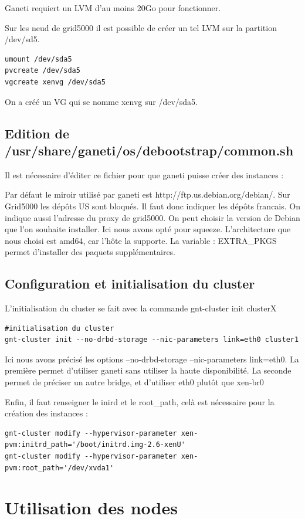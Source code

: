 Ganeti requiert un LVM d'au moins 20Go pour fonctionner.

Sur les neud de grid5000 il est possible de créer un tel LVM sur la partition /dev/sd5.
\begin{lstlisting}
umount /dev/sda5
pvcreate /dev/sda5
vgcreate xenvg /dev/sda5
\end{lstlisting}
On a créé un VG qui se nomme xenvg sur /dev/sda5.

\subsection {Edition de /usr/share/ganeti/os/debootstrap/common.sh}

Il est nécessaire d'éditer ce fichier pour que ganeti puisse créer des instances :

Par défaut le miroir utilisé par ganeti est http://ftp.us.debian.org/debian/. Sur Grid5000 les dépôts US sont bloqués. Il faut donc indiquer les dépôts francais.
On indique aussi l'adresse du proxy de grid5000.
On peut choisir la version de Debian que l'on souhaite installer. Ici nous avons opté pour squeeze.
L'architecture que nous choisi est amd64, car l'hôte la supporte.
La variable : EXTRA\_PKGS permet d'installer des paquets supplémentaires.

\subsection {Configuration et initialisation du cluster}
L'initialisation du cluster se fait avec la commande gnt-cluster init clusterX
\begin{lstlisting}
#initialisation du cluster
gnt-cluster init --no-drbd-storage --nic-parameters link=eth0 cluster1
\end{lstlisting}
Ici nous avons précisé les options --no-drbd-storage --nic-parameters link=eth0.
La première permet d'utiliser ganeti sans utiliser la haute disponibilité.
La seconde permet de préciser un autre bridge, et d'utiliser eth0 plutôt que xen-br0

Enfin, il faut renseigner le inird et le root\_path, celà est nécessaire pour la création des instances :
\begin{lstlisting}
gnt-cluster modify --hypervisor-parameter xen-pvm:initrd_path='/boot/initrd.img-2.6-xenU'
gnt-cluster modify --hypervisor-parameter xen-pvm:root_path='/dev/xvda1'
\end{lstlisting}  

\section {Utilisation des nodes}
